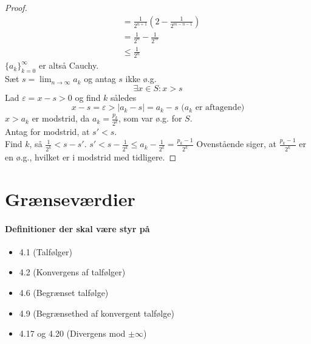 \begin{proof}
\begin{align}
&=\frac{1}{2^{n+1}}\left(2-\frac{1}{2^{m-n-1}}\right)\\
&=\frac{1}{2^n}-\frac{1}{2^m}\\
&\leq \frac{1}{2^n}
\end{align}
$\{a_k\}_{k=0}^\infty$ er altså Cauchy.\\
Sæt $s=\lim_{n\to\infty}a_k$ og antag $s$ ikke ø.g.
\begin{equation}
\exists x \in S: x > s
\end{equation}
Lad $\varepsilon = x - s > 0$ og find $k$ således
\begin{equation}
x - s = \varepsilon > |a_k - s| = a_k - s\text{ ($a_k$ er aftagende)}
\end{equation}
$x > a_k$ er modstrid, da $a_k = \frac{p_k}{2^k}$, som var ø.g. for $S$.\\
Antag for modstrid, at $s' < s$.\\
Find $k$, så $\frac{1}{2^k} < s-s'$.
$s' < s-\frac{1}{2^k} \leq a_k-\frac{1}{2^k} = \frac{p_k-1}{2^k}$
Ovenstående siger, at $\frac{p_k-1}{2^k}$ er en ø.g., hvilket er i modstrid med tidligere.
\end{proof}
\clearpage
\chapter{Grænseværdier}
\subsubsection{Definitioner der skal være styr på}
\begin{itemize}
\setlength\itemsep{0em}
\item 4.1 (Talfølger)
\item 4.2 (Konvergens af talfølger)
\item 4.6 (Begrænset talfølge)
\item 4.9 (Begrænsethed af konvergent talfølge)
\item 4.17 og 4.20 (Divergens mod $\pm \infty$)
\end{itemize}
